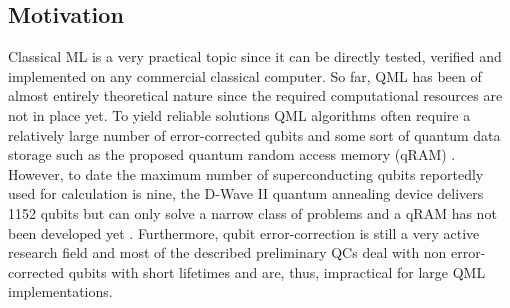 \documentclass[a4paper]{article}
\newcommand*{\0}{$\ket{0}$}
\newcommand*{\1}{$\ket{1}$}
\begin{document}






\newpage

\subsection{Motivation}
\label{subsec:motivation}

Classical ML is a very practical topic since it can be directly tested, verified and implemented on any commercial classical computer. So far, QML has been of almost entirely theoretical nature since the required computational resources are not in place yet. To yield reliable solutions QML algorithms often require a relatively large number of error-corrected qubits and some sort of quantum data storage such as the proposed quantum random access memory (qRAM) \citep{qRAM}. However, to date the maximum number of superconducting qubits reportedly used for calculation is nine, the D-Wave II quantum annealing device delivers 1152 qubits but can only solve a narrow class of problems and a qRAM has not been developed yet \citep{hydrogensimulation, dwave2}. Furthermore, qubit error-correction is still a very active research field and most of the described preliminary QCs deal with non error-corrected qubits with short lifetimes and are, thus, impractical for large QML implementations.
\end{document}
